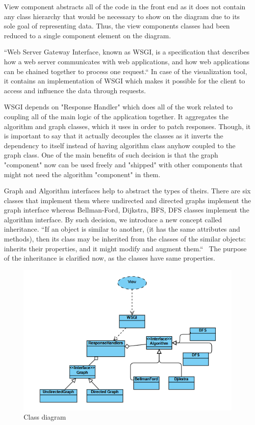 View component abstracts all of the code in the front end as it does not contain any class hierarchy that would be necessary to show on the diagram due to its sole goal of representing data. Thus, the view components classes had been reduced to a single component element on the diagram.

``Web Server Gateway Interface, known as WSGI, is a specification that describes how a web server communicates with web applications, and how web applications can be chained together to process one request.``\cite{wsgi-def} In case of the visualization tool, it contains an implementation of WSGI which makes it possible for the client to access and influence the data through requests.

WSGI depends on "Response Handler" which does all of the work related to coupling all of the main logic of the application together. It aggregates the algorithm and graph classes, which it uses in order to patch responses. Though, it is important to say that it actually decouples the classes as it inverts the dependency to itself instead of having algorithm class anyhow coupled to the graph class. One of the main benefits of such decision is that the graph "component" now can be used freely and "shipped" with other components that might not need the algorithm "component" in them.

Graph and Algorithm interfaces help to abstract the types of theirs. There are six classes that implement them where undirected and directed graphs implement the graph interface whereas Bellman-Ford, Dijkstra, BFS, DFS classes implement the algorithm interface. By such decision, we introduce a new concept called inheritance. ``If an object is similar to another, (it has the same attributes and methods), then its class may be inherited from the classes of the similar objects: inherits their properties, and it might modify and augment them.``~\cite{oop-inheritance_def} The purpose of the inheritance is clarified now, as the classes have same properties.

\begin{figure}[H]
	\centering
	\includegraphics[width=\textwidth]{images/class_diagram.png}
	\caption{Class diagram}
\end{figure}

